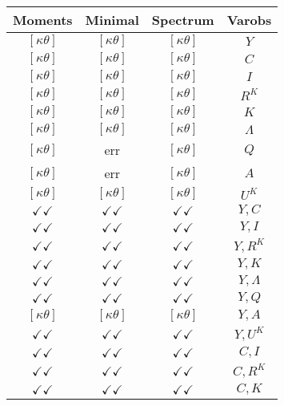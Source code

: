 \documentclass[a4paper,10pt]{article}
\begin{document}
\centering
\begin{longtable}{|c|c|c|c|}
\hline
Moments & Minimal & Spectrum & Varobs \\
\hline
$[\kappa \theta ]$ & $[\kappa \theta ]$ & $[\kappa \theta ]$ & ${Y}$ \\
\hline
$[\kappa \theta ]$ & $[\kappa \theta ]$ & $[\kappa \theta ]$ & ${C}$ \\
\hline
$[\kappa \theta ]$ & $[\kappa \theta ]$ & $[\kappa \theta ]$ & ${I}$ \\
\hline
$[\kappa \theta ]$ & $[\kappa \theta ]$ & $[\kappa \theta ]$ & ${R^{K}}$ \\
\hline
$[\kappa \theta ]$ & $[\kappa \theta ]$ & $[\kappa \theta ]$ & ${K}$ \\
\hline
$[\kappa \theta ]$ & $[\kappa \theta ]$ & $[\kappa \theta ]$ & ${\Lambda}$ \\
\hline
$[\kappa \theta ]$ & err & $[\kappa \theta ]$ & ${Q}$ \\
\hline
$[\kappa \theta ]$ & err & $[\kappa \theta ]$ & ${A}$ \\
\hline
$[\kappa \theta ]$ & $[\kappa \theta ]$ & $[\kappa \theta ]$ & ${U^K}$ \\
\hline
$\checkmark\checkmark$ & $\checkmark\checkmark$ & $\checkmark\checkmark$ & ${Y},{C}$ \\
\hline
$\checkmark\checkmark$ & $\checkmark\checkmark$ & $\checkmark\checkmark$ & ${Y},{I}$ \\
\hline
$\checkmark\checkmark$ & $\checkmark\checkmark$ & $\checkmark\checkmark$ & ${Y},{R^{K}}$ \\
\hline
$\checkmark\checkmark$ & $\checkmark\checkmark$ & $\checkmark\checkmark$ & ${Y},{K}$ \\
\hline
$\checkmark\checkmark$ & $\checkmark\checkmark$ & $\checkmark\checkmark$ & ${Y},{\Lambda}$ \\
\hline
$\checkmark\checkmark$ & $\checkmark\checkmark$ & $\checkmark\checkmark$ & ${Y},{Q}$ \\
\hline
$[\kappa \theta ]$ & $[\kappa \theta ]$ & $[\kappa \theta ]$ & ${Y},{A}$ \\
\hline
$\checkmark\checkmark$ & $\checkmark\checkmark$ & $\checkmark\checkmark$ & ${Y},{U^K}$ \\
\hline
$\checkmark\checkmark$ & $\checkmark\checkmark$ & $\checkmark\checkmark$ & ${C},{I}$ \\
\hline
$\checkmark\checkmark$ & $\checkmark\checkmark$ & $\checkmark\checkmark$ & ${C},{R^{K}}$ \\
\hline
$\checkmark\checkmark$ & $\checkmark\checkmark$ & $\checkmark\checkmark$ & ${C},{K}$ \\

\end{longtable}
\end{document}
